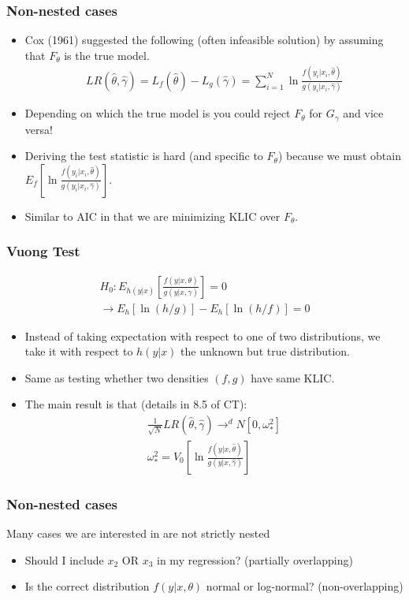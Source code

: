 \begin{frame}
\frametitle{Non-nested cases}
\begin{itemize}
\item Cox (1961) suggested the following (often infeasible solution) by assuming that $F_{\theta}$ is the true model.
\begin{eqnarray*}
LR(\hat{\theta},\hat{\gamma}) = L_f(\hat{\theta}) - L_g (\hat{\gamma}) = \sum_{i=1}^N \ln \frac{f(y_i | x_i, \hat{\theta})}{g(y_i | x_i, \hat{\gamma})}
\end{eqnarray*}
\item Depending on which the true model is you could reject $F_{\theta}$ for $G_{\gamma}$ and vice versa!
\item Deriving the test statistic is hard (and specific to $F_{\theta}$) because we must obtain $E_f [\ln \frac{f(y_i | x_i, \hat{\theta})}{g(y_i | x_i, \hat{\gamma})}]$.
\item Similar to AIC in that we are minimizing KLIC over $F_{\theta}$.
\end{itemize}
\end{frame}

\begin{frame}
\frametitle{Vuong Test}
\begin{eqnarray*}
H_0: E_{h(y|x)} \left[ \frac{ f(y | x,\theta) }{g(y | x, \gamma)} \right] = 0  \\
\rightarrow E_h[\ln(h/g)] - E_h[\ln (h/f)] = 0
\end{eqnarray*}
\begin{itemize}
\item Instead of taking expectation with respect to one of two distributions, we take it with respect to $h(y |x)$ the unknown but \alert{true distribution}.
\item Same as testing whether two densities $(f,g)$ have same KLIC.
\item The main result is that (details in 8.5 of CT):
\begin{eqnarray*}
\frac{1}{\sqrt{N}} LR(\hat{\theta},\hat{\gamma}) \rightarrow^d N [0,\omega_{*}^2]\\
\omega_{*}^2 =  V_0 \left[ \ln \frac{f(y| x, \hat{\theta})}{g(y| x, \hat{\gamma})}  \right]
\end{eqnarray*}
\end{itemize}
\end{frame}


\begin{frame}
\frametitle{Non-nested cases}
Many cases we are interested in are \alert{not strictly nested}
\begin{itemize}
\item Should I include $x_2$ OR $x_3$ in my regression? (partially overlapping)
\item Is the correct distribution $f(y | x, \theta)$ normal or log-normal? (non-overlapping)
\end{itemize}
\end{frame}

